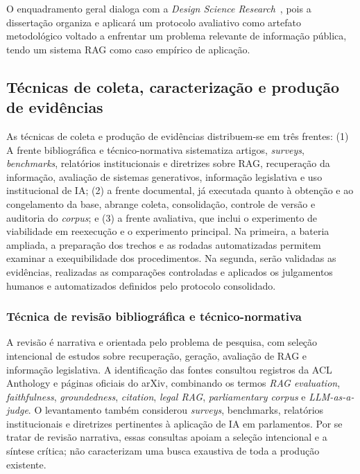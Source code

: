 O enquadramento geral dialoga com a \textit{Design Science Research}~\parencite{hevnerEtAl2004designScience,peffersEtAl2007dsrm}, pois a dissertação organiza e aplicará um protocolo avaliativo como artefato metodológico voltado a enfrentar um problema relevante de informação pública, tendo um sistema RAG como caso empírico de aplicação.

\subsection{Técnicas de coleta, caracterização e produção de evidências}

As técnicas de coleta e produção de evidências distribuem-se em três frentes: (1) A frente bibliográfica e técnico-normativa
sistematiza artigos, \textit{surveys}, \textit{benchmarks}, relatórios institucionais e diretrizes sobre RAG, recuperação da
informação, avaliação de sistemas generativos, informação legislativa e uso institucional de IA; (2) a frente documental, já
executada quanto à obtenção e ao congelamento da base, abrange coleta, consolidação, controle de versão e auditoria do
\textit{corpus}; e (3) a frente avaliativa, que inclui o experimento de viabilidade em reexecução e o experimento principal.
Na primeira, a bateria ampliada, a preparação dos trechos e as rodadas automatizadas permitem examinar a exequibilidade dos
procedimentos. Na segunda, serão validadas as evidências, realizadas as comparações controladas e aplicados os julgamentos
humanos e automatizados definidos pelo protocolo consolidado.

\subsubsection{Técnica de revisão bibliográfica e técnico-normativa}

A revisão é narrativa e orientada pelo problema de pesquisa, com seleção intencional de estudos sobre recuperação, geração, avaliação de RAG e informação legislativa. A identificação das fontes consultou registros da ACL Anthology e páginas oficiais do arXiv, combinando os termos \textit{RAG evaluation}, \textit{faithfulness}, \textit{groundedness}, \textit{citation}, \textit{legal RAG}, \textit{parliamentary corpus} e \textit{LLM-as-a-judge}. O levantamento também considerou \textit{surveys}, benchmarks, relatórios institucionais e diretrizes pertinentes à aplicação de IA em parlamentos. Por se tratar de revisão narrativa, essas consultas apoiam a seleção intencional e a síntese crítica; não caracterizam uma busca exaustiva de toda a produção existente.

